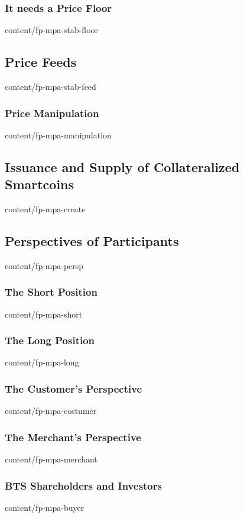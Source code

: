 \documentclass[conference,final,10pt,a4paper]{IEEEtran}
\begin{document}
\subsubsection  { It needs a Price Floor                           }  { content/fp-mpa-stab-floor      } 
\subsection     { Price Feeds                                      }  { content/fp-mpa-stab-feed       } 
\subsubsection  { Price Manipulation                               }  { content/fp-mpa-manipulation    } 
\subsection     { Issuance and Supply of Collateralized Smartcoins }  { content/fp-mpa-create          } 
\subsection     { Perspectives of Participants                     }  { content/fp-mpa-persp           } 
\subsubsection  { The Short Position                               }  { content/fp-mpa-short           } 
\subsubsection  { The Long Position                                }  { content/fp-mpa-long            } 
\subsubsection  { The Customer's Perspective                       }  { content/fp-mpa-costumer        } 
\subsubsection  { The Merchant's Perspective                       }  { content/fp-mpa-merchant        } 
\subsubsection  { BTS Shareholders and Investors                   }  { content/fp-mpa-buyer           } 
\end{document}
